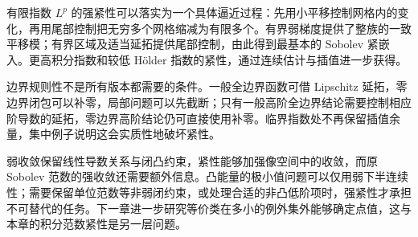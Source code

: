 



\begin{chaptersummary}
有限指数 \(L^p\) 的强紧性可以落实为一个具体逼近过程：先用小平移控制网格内的变化，再用尾部控制把无穷多个网格缩减为有限多个。有界弱梯度提供了整族的一致平移模；有界区域及适当延拓提供尾部控制，由此得到最基本的 Sobolev 紧嵌入。更高积分指数和较低 Hölder 指数的紧性，通过连续估计与插值进一步获得。

\ProseParagraphBreak

边界规则性不是所有版本都需要的条件。一般全边界函数可借 Lipschitz 延拓，零边界闭包可以补零，局部问题可以先截断；只有一般高阶全边界结论需要控制相应阶导数的延拓，零边界高阶结论仍可直接使用补零。临界指数处不再保留插值余量，集中例子说明这会实质性地破坏紧性。

\ProseParagraphBreak

弱收敛保留线性导数关系与闭凸约束，紧性能够加强像空间中的收敛，而原 Sobolev 范数的强收敛还需要额外信息。凸能量的极小值问题可以仅用弱下半连续性；需要保留单位范数等非弱闭约束，或处理合适的非凸低阶项时，强紧性才承担不可替代的任务。下一章进一步研究等价类在多小的例外集外能够确定点值，这与本章的积分范数紧性是另一层问题。
\end{chaptersummary}

\BookExercises


